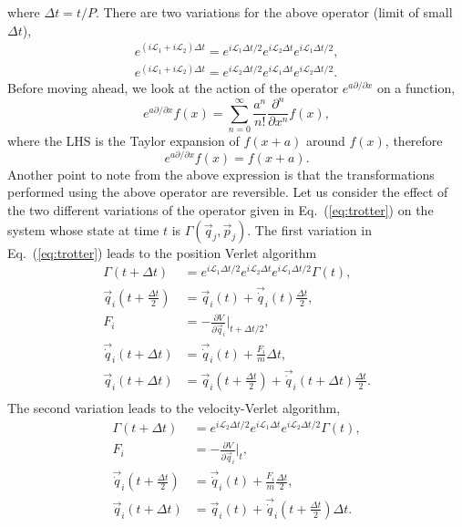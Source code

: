 \documentclass[a4paper]{article}
\begin{document}
where $\Delta t=t/P$. There are two variations for the above operator (limit of small $\Delta t$),
\begin{equation}\label{eq:trotter}
\begin{split}
e^{\left(i\mathscr{L}_{1}+i\mathscr{L}_{2}\right)\Delta t}=e^{i\mathscr{L}_{1}\Delta t/2}e^{i\mathscr{L}_{2}\Delta t}e^{i\mathscr{L}_{1}\Delta t/2},\\
e^{\left(i\mathscr{L}_{1}+i\mathscr{L}_{2}\right)\Delta t}=e^{i\mathscr{L}_{2}\Delta t/2}e^{i\mathscr{L}_{1}\Delta t}e^{i\mathscr{L}_{2}\Delta t/2}.
\end{split}
\end{equation}
Before moving ahead, we look at the action of the operator $e^{a\partial/\partial x}$ on a function,
\begin{equation}
e^{a\partial/\partial x}f(x)=\sum_{n=0}^{\infty}\frac{a^{n}}{n!}\frac{\partial^{n}}{\partial x^{n}} f(x),
\end{equation}
where the LHS is the Taylor expansion of $f(x+a)$ around $f(x)$, therefore 
\begin{equation}
e^{a\partial/\partial x}f(x)=f(x+a).
\end{equation}
Another point to note from the above expression is that the transformations performed using the above operator are reversible. Let us consider the effect of the two different variations of the operator given in Eq.~(\ref{eq:trotter}) on the system whose state at time $t$ is $\Gamma(\vec{q}_{j},\vec{p}_{j})$. The first variation in Eq.~(\ref{eq:trotter}) leads to the position Verlet algorithm
\begin{equation}
\begin{split}
\Gamma(t+\Delta t)&=e^{i\mathscr{L}_{1}\Delta t/2}e^{i\mathscr{L}_{2}\Delta t}e^{i\mathscr{L}_{1}\Delta t/2}\Gamma(t),\\
\vec{q}_{i}(t+\frac{\Delta t}{2})&=\vec{q}_{i}(t) +\vec{\dot{q}}_{i}(t)\frac{\Delta t}{2},\\
F_{i}&=-\frac{\partial V}{\partial \vec{q}_{i}}\Bigg|_{t+\Delta t/2},\\
\vec{\dot{q}}_{i}(t+\Delta t)&=\vec{\dot{q}}_{i}(t) + \frac{F_{i}}{m}\Delta t,\\
\vec{q}_{i}(t+\Delta t)&=\vec{q}_{i}(t+\frac{\Delta t}{2}) +\vec{\dot{q}}_{i}(t+\Delta t)\frac{\Delta t}{2}.\\
\end{split}
\end{equation}
The second variation leads to the velocity-Verlet algorithm,
\begin{equation}
\begin{split}
\Gamma(t+\Delta t)&=e^{i\mathscr{L}_{2}\Delta t/2}e^{i\mathscr{L}_{1}\Delta t}e^{i\mathscr{L}_{2}\Delta t/2}\Gamma(t),\\
F_{i}&=-\frac{\partial V}{\partial \vec{q}_{i}}\Bigg|_{t},\\
\vec{\dot{q}}_{i}(t+\frac{\Delta t}{2})&=\vec{\dot{q}}_{i}(t) +\frac{F_{i}}{m}\frac{\Delta t}{2},\\
\vec{q}_{i}(t+\Delta t)&=\vec{q}_{i}(t) +\vec{\dot{q}}_{i}\left(t+\frac{\Delta t}{2}\right)\Delta t.\\
\end{split}
\end{equation}
\end{document}
